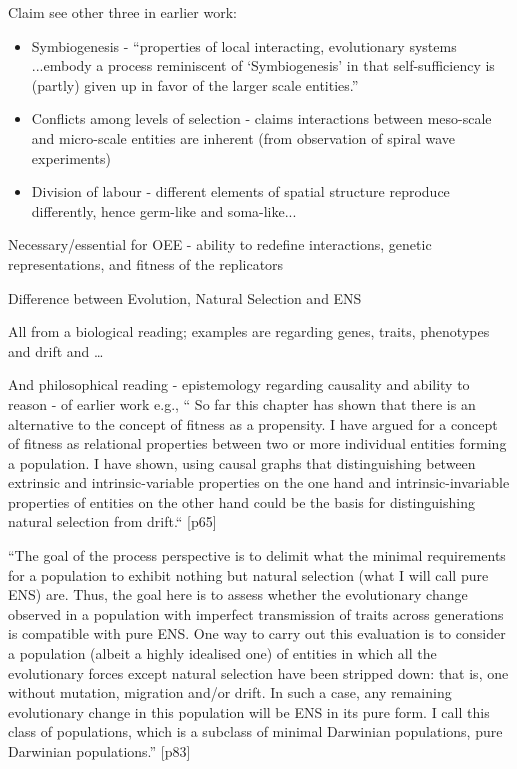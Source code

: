 					Claim see other three in earlier work:
					
					\begin{itemize}
						\item
						
						Symbiogenesis - ``properties of local interacting, evolutionary
						systems ...embody a process reminiscent of `Symbiogenesis' in
						that self-sufficiency is (partly) given up in favor of the
						larger scale entities.''
						
						\item
						
						Conflicts among levels of selection - claims interactions
						between meso-scale and micro-scale entities are inherent (from
						observation of spiral wave experiments)
						
						\item
						
						Division of labour - different elements of spatial structure
						reproduce differently, hence germ-like and soma-like...
						
					\end{itemize}


			Necessary/essential for OEE - ability to redefine interactions,
			genetic representations, and fitness of the replicators

\autocite{Bourrat2015}


	Difference between Evolution, Natural Selection and ENS
		

		All from a biological reading; examples are regarding genes, traits,
		phenotypes and drift and \ldots{}

		
		And philosophical reading - epistemology regarding causality and
		ability to reason - of earlier work e.g., `` So far this chapter has
		shown that there is an alternative to the concept of fitness as a
		propensity. I have argued for a concept of fitness as relational
		properties between two or more individual entities forming a
		population. I have shown, using causal graphs that distinguishing
		between extrinsic and intrinsic-variable properties on the one hand
		and intrinsic-invariable properties of entities on the other hand
		could be the basis for distinguishing natural selection from
		drift.`` {[}p65{]}
		

``The goal of the process perspective is to delimit what the minimal
requirements for a population to exhibit nothing but natural selection
(what I will call pure ENS) are. Thus, the goal here is to assess
whether the evolutionary change observed in a population with
imperfect transmission of traits across generations is compatible with
pure ENS. One way to carry out this evaluation is to consider a
population (albeit a highly idealised one) of entities in which all
the evolutionary forces except natural selection have been stripped
down: that is, one without mutation, migration and/or drift. In such a
case, any remaining evolutionary change in this population will be ENS
in its pure form. I call this class of populations, which is a
subclass of minimal Darwinian populations, pure Darwinian
populations.'' {[}p83{]}


